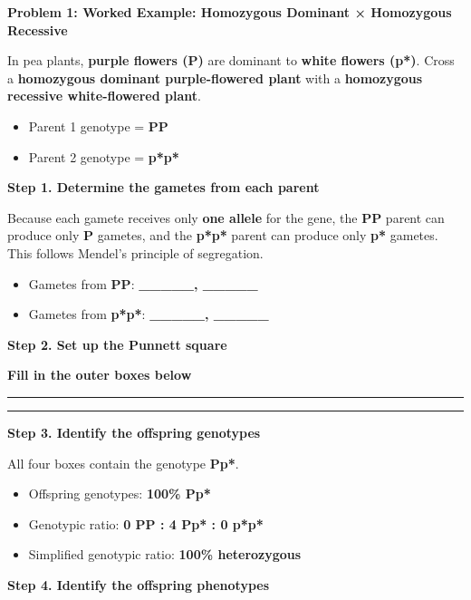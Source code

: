 \documentclass[
  letterpaper,
  DIV=11,
  numbers=noendperiod]{scrreprt}
\begin{document}
\textbf{Problem 1: Worked Example: Homozygous Dominant × Homozygous
Recessive}

In pea plants, \textbf{purple flowers (P)} are dominant to \textbf{white
flowers (p*)}. Cross a \textbf{homozygous dominant purple-flowered
plant} with a \textbf{homozygous recessive white-flowered plant}.

\begin{itemize}
\item
  Parent 1 genotype = \textbf{PP}
\item
  Parent 2 genotype = \textbf{p*p*}
\end{itemize}

\textbf{Step 1. Determine the gametes from each parent}

Because each gamete receives only \textbf{one allele} for the gene, the
\textbf{PP} parent can produce only \textbf{P} gametes, and the
\textbf{p*p*} parent can produce only \textbf{p*} gametes. This follows
Mendel's principle of segregation.

\begin{itemize}
\item
  Gametes from \textbf{PP}: \textbf{\_\_\_\_\_, \_\_\_\_\_}
\item
  Gametes from \textbf{p*p*}: \textbf{\_\_\_\_\_, \_\_\_\_\_}
\end{itemize}

\textbf{Step 2. Set up the Punnett square}

\textbf{Fill in the outer boxes below}

\begin{center}\rule{0.5\linewidth}{0.5pt}\end{center}

\begin{center}\rule{0.5\linewidth}{0.5pt}\end{center}

\textbf{Step 3. Identify the offspring genotypes}

All four boxes contain the genotype \textbf{Pp*}.

\begin{itemize}
\item
  Offspring genotypes: \textbf{100\% Pp*}
\item
  Genotypic ratio: \textbf{0 PP : 4 Pp* : 0 p*p*}
\item
  Simplified genotypic ratio: \textbf{100\% heterozygous}
\end{itemize}

\textbf{Step 4. Identify the offspring phenotypes}
\end{document}
